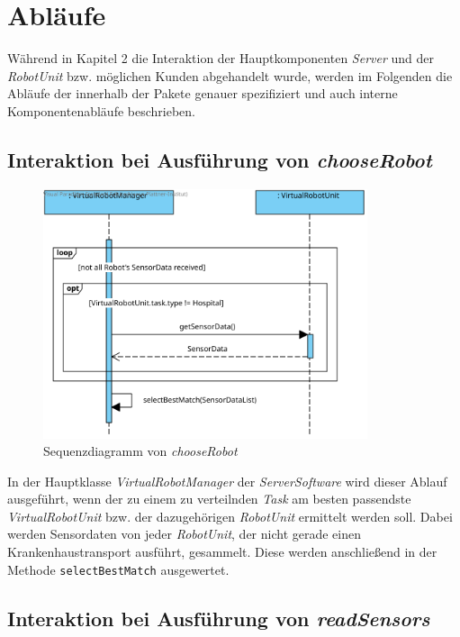 \section{Abläufe}

Während in Kapitel 2 die Interaktion der Hauptkomponenten \textit{Server} und der \textit{RobotUnit} bzw. möglichen Kunden abgehandelt wurde, werden im Folgenden die Abläufe der innerhalb der Pakete genauer spezifiziert und auch interne Komponentenabläufe beschrieben.

\subsection*{Interaktion bei Ausführung von \textit{chooseRobot}}


\begin{figure}[H]
	\centering
	\includegraphics[width=0.85\textwidth]{img/8-chooseRobot}
	\caption{Sequenzdiagramm von \emph{chooseRobot}}
	\label{chooseRobotInteraktion}
\end{figure}
In der Hauptklasse \textit{VirtualRobotManager} der \textit{ServerSoftware} wird dieser Ablauf ausgeführt, wenn der zu einem zu verteilnden \textit{Task} am besten passendste \textit{VirtualRobotUnit} bzw. der dazugehörigen \textit{RobotUnit} ermittelt werden soll. Dabei werden Sensordaten von jeder \textit{RobotUnit}, der nicht gerade einen Krankenhaustransport ausführt, gesammelt. Diese werden anschließend in der Methode \texttt{selectBestMatch} ausgewertet.
\\

\subsection*{Interaktion bei Ausführung von \textit{readSensors}}



